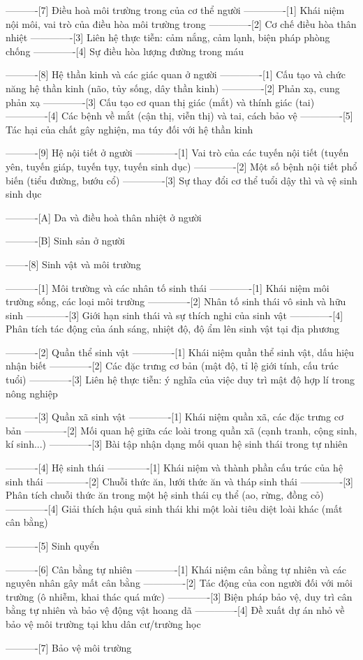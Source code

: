 ----------[7] Điều hoà môi trường trong của cơ thể người
-------------[1] Khái niệm nội môi, vai trò của điều hòa môi trường trong
-------------[2] Cơ chế điều hòa thân nhiệt
-------------[3] Liên hệ thực tiễn: cảm nắng, cảm lạnh, biện pháp phòng chống
-------------[4] Sự điều hòa lượng đường trong máu

----------[8] Hệ thần kinh và các giác quan ở người
-------------[1] Cấu tạo và chức năng hệ thần kinh (não, tủy sống, dây thần kinh)
-------------[2] Phản xạ, cung phản xạ
-------------[3] Cấu tạo cơ quan thị giác (mắt) và thính giác (tai)
-------------[4] Các bệnh về mắt (cận thị, viễn thị) và tai, cách bảo vệ
-------------[5] Tác hại của chất gây nghiện, ma túy đối với hệ thần kinh

----------[9] Hệ nội tiết ở người
-------------[1] Vai trò của các tuyến nội tiết (tuyến yên, tuyến giáp, tuyến tụy, tuyến sinh dục)
-------------[2] Một số bệnh nội tiết phổ biến (tiểu đường, bướu cổ)
-------------[3] Sự thay đổi cơ thể tuổi dậy thì và vệ sinh sinh dục

----------[A] Da và điều hoà thân nhiệt ở người

----------[B] Sinh sản ở người

-------[8] Sinh vật và môi trường

----------[1] Môi trường và các nhân tố sinh thái
-------------[1] Khái niệm môi trường sống, các loại môi trường
-------------[2] Nhân tố sinh thái vô sinh và hữu sinh
-------------[3] Giới hạn sinh thái và sự thích nghi của sinh vật
-------------[4] Phân tích tác động của ánh sáng, nhiệt độ, độ ẩm lên sinh vật tại địa phương

----------[2] Quần thể sinh vật
-------------[1] Khái niệm quần thể sinh vật, dấu hiệu nhận biết
-------------[2] Các đặc trưng cơ bản (mật độ, tỉ lệ giới tính, cấu trúc tuổi)
-------------[3] Liên hệ thực tiễn: ý nghĩa của việc duy trì mật độ hợp lí trong nông nghiệp

----------[3] Quần xã sinh vật
-------------[1] Khái niệm quần xã, các đặc trưng cơ bản
-------------[2] Mối quan hệ giữa các loài trong quần xã (cạnh tranh, cộng sinh, kí sinh...)
-------------[3] Bài tập nhận dạng mối quan hệ sinh thái trong tự nhiên

----------[4] Hệ sinh thái
-------------[1] Khái niệm và thành phần cấu trúc của hệ sinh thái
-------------[2] Chuỗi thức ăn, lưới thức ăn và tháp sinh thái
-------------[3] Phân tích chuỗi thức ăn trong một hệ sinh thái cụ thể (ao, rừng, đồng cỏ)
-------------[4] Giải thích hậu quả sinh thái khi một loài tiêu diệt loài khác (mất cân bằng)

----------[5] Sinh quyển

----------[6] Cân bằng tự nhiên
-------------[1] Khái niệm cân bằng tự nhiên và các nguyên nhân gây mất cân bằng
-------------[2] Tác động của con người đối với môi trường (ô nhiễm, khai thác quá mức)
-------------[3] Biện pháp bảo vệ, duy trì cân bằng tự nhiên và bảo vệ động vật hoang dã
-------------[4] Đề xuất dự án nhỏ về bảo vệ môi trường tại khu dân cư/trường học

----------[7] Bảo vệ môi trường

